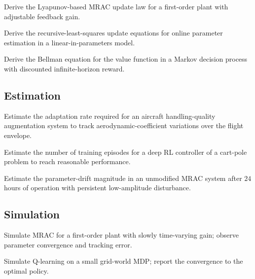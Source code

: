 \begin{exercise}
Derive the Lyapunov-based MRAC update law for a first-order plant with adjustable feedback gain.
\end{exercise}

\begin{exercise}
Derive the recursive-least-squares update equations for online parameter estimation in a linear-in-parameters model.
\end{exercise}

\begin{exercise}
Derive the Bellman equation for the value function in a Markov decision process with discounted infinite-horizon reward.
\end{exercise}

\subsection*{Estimation}

\begin{exercise}
Estimate the adaptation rate required for an aircraft handling-quality augmentation system to track aerodynamic-coefficient variations over the flight envelope.
\end{exercise}

\begin{exercise}
Estimate the number of training episodes for a deep RL controller of a cart-pole problem to reach reasonable performance.
\end{exercise}

\begin{exercise}
Estimate the parameter-drift magnitude in an unmodified MRAC system after $24$ hours of operation with persistent low-amplitude disturbance.
\end{exercise}

\subsection*{Simulation}

\begin{exercise}
Simulate MRAC for a first-order plant with slowly time-varying gain; observe parameter convergence and tracking error.
\end{exercise}

\begin{exercise}
Simulate Q-learning on a small grid-world MDP; report the convergence to the optimal policy.
\end{exercise}

